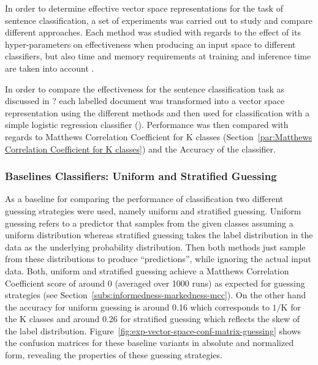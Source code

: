 In order to determine effective vector space representations for the task of sentence classification, a set of experiments was carried out to study and compare different approaches. Each method was studied with regards to the effect of its hyper-parameters on effectiveness when producing an input space to different classifiers, but also time and memory requirements at training and inference time are taken into account .

In order to compare the effectiveness for the sentence classification task as discussed in ? each labelled document was transformed into a vector space representation using the different methods and then used for classification with a simple logistic regression classifier (). Performance was then compared with regards to Matthews Correlation Coefficient for K classes (Section~\ref{par:Matthews Correlation Coefficient for K classes}) and the Accuracy  of the classifier.

\subsubsection{Baselines Classifiers: Uniform and Stratified Guessing}
\label{subs:baselines-classifiers}

As a baseline for comparing the performance of classification two different guessing strategies were used, namely uniform and stratified guessing.
Uniform guessing refers to a predictor that samples from the given classes assuming a uniform distribution whereas stratified guessing takes the label distribution in the data as the underlying probability distribution.
Then both methods just sample from these distributions to produce ``predictions'', while ignoring the actual input data. Both, uniform and stratified guessing achieve a Matthews Correlation Coefficient score of around 0 (averaged over 1000 runs) as expected for guessing strategies (see Section~\ref{subs:informedness-markedness-mcc}). On the other hand the accuracy for uniform guessing is around 0.16 which corresponds to $1/\text{K}$ for the K classes and around 0.26 for stratified guessing which reflects the skew of the label distribution.
Figure~\ref{fig:exp-vector-space-conf-matrix-guessing} shows the confusion matrices for these baseline variants in absolute and normalized form, revealing the properties of these guessing strategies.

